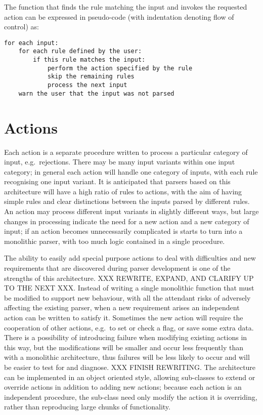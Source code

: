 The function that finds the rule matching the input and invokes the
requested action can be expressed in pseudo-code (with indentation denoting
flow of control) as:

\begin{verbatim}
for each input:
    for each rule defined by the user:
        if this rule matches the input:
            perform the action specified by the rule
            skip the remaining rules
            process the next input
    warn the user that the input was not parsed
\end{verbatim}

\section{Actions}

\label{actions in architecture}

Each action is a separate procedure written to process a particular
category of input, e.g.\ rejections.  There may be many input variants
within one input category; in general each action will handle one category
of inputs, with each rule recognising one input variant.  It is anticipated
that parsers based on this architecture will have a high ratio of rules to
actions, with the aim of having simple rules and clear distinctions between
the inputs parsed by different rules.  An action may process different
input variants in slightly different ways, but large changes in processing
indicate the need for a new action and a new category of input; if an
action becomes unnecessarily complicated is starts to turn into a
monolithic parser, with too much logic contained in a single procedure.

The ability to easily add special purpose actions to deal with difficulties
and new requirements that are discovered during parser development is one
of the strengths of this architecture.  XXX REWRITE, EXPAND, AND CLARIFY UP
TO THE NEXT XXX\@.  Instead of writing a single monolithic function that
must be modified to support new behaviour, with all the attendant risks of
adversely affecting the existing parser, when a new requirement arises an
independent action can be written to satisfy it.  Sometimes the new action
will require the cooperation of other actions, e.g.\ to set or check a
flag, or save some extra data.  There is a possibility of introducing
failure when modifying existing actions in this way, but the modifications
will be smaller and occur less frequently than with a monolithic
architecture, thus failures will be less likely to occur and will be easier
to test for and diagnose.  XXX FINISH REWRITING\@.  The architecture can be
implemented in an object oriented style, allowing sub-classes to extend or
override actions in addition to adding new actions; because each action is
an independent procedure, the sub-class need only modify the action it is
overriding, rather than reproducing large chunks of functionality.

